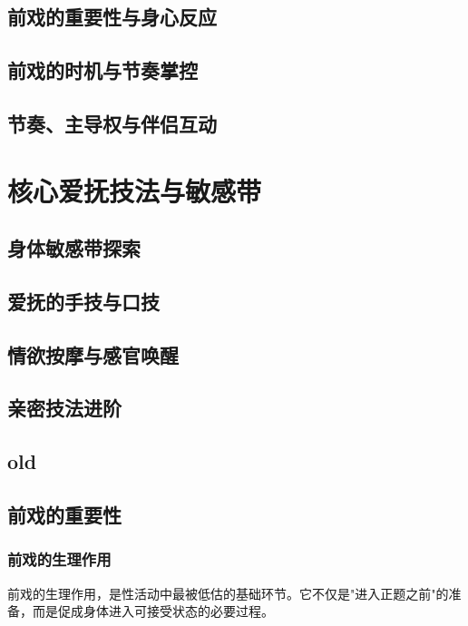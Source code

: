 \documentclass[12pt,UTF8]{ctexbook}
\begin{document}
\section{前戏的重要性与身心反应}

\section{前戏的时机与节奏掌控}

\section{节奏、主导权与伴侣互动}

\chapter{核心爱抚技法与敏感带}

\section{身体敏感带探索}

\section{爱抚的手技与口技}

\section{情欲按摩与感官唤醒}

\section{亲密技法进阶}

\section{old}
\section{前戏的重要性}
\subsection{前戏的生理作用}

前戏的生理作用，是性活动中最被低估的基础环节。它不仅是"进入正题之前"的准备，而是促成身体进入可接受状态的必要过程。
\end{document}

